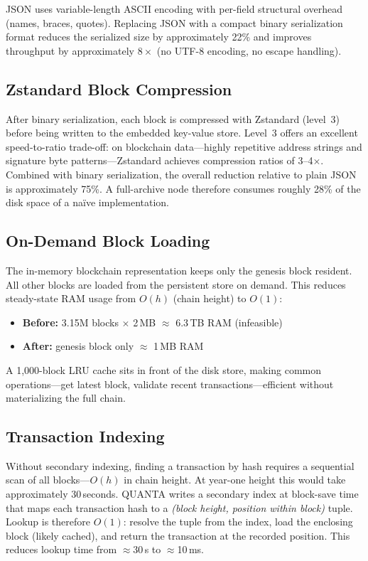 \documentclass[11pt,a4paper]{article}
\begin{document}
JSON uses variable-length ASCII encoding with per-field structural overhead
(names, braces, quotes). Replacing JSON with a compact binary serialization
format reduces the serialized size by approximately 22\% and improves
throughput by approximately $8\times$ (no UTF-8 encoding, no escape handling).

\subsection{Zstandard Block Compression}

After binary serialization, each block is compressed with Zstandard
(level~3) before being written to the embedded key-value store.
Level~3 offers an excellent speed-to-ratio trade-off: on blockchain
data---highly repetitive address strings and signature byte patterns---Zstandard
achieves compression ratios of 3--4$\times$. Combined with binary
serialization, the overall reduction relative to plain JSON is approximately
75\%. A full-archive node therefore consumes roughly 28\% of the disk space of
a na\"{i}ve implementation.

\subsection{On-Demand Block Loading}

The in-memory blockchain representation keeps only the genesis block resident.
All other blocks are loaded from the persistent store on demand. This reduces
steady-state RAM usage from $O(h)$ (chain height) to $O(1)$:

\begin{itemize}
  \item \textbf{Before:} 3.15M blocks $\times$ 2\,MB $\approx$ 6.3\,TB RAM (infeasible)
  \item \textbf{After:} genesis block only $\approx$ 1\,MB RAM
\end{itemize}

A 1,000-block LRU cache sits in front of the disk store, making common
operations---get latest block, validate recent transactions---efficient without
materializing the full chain.

\subsection{Transaction Indexing}

Without secondary indexing, finding a transaction by hash requires a sequential
scan of all blocks---$O(h)$ in chain height. At year-one height this would take
approximately 30\,seconds. QUANTA writes a secondary index at block-save time
that maps each transaction hash to a \emph{(block height, position within block)}
tuple. Lookup is therefore $O(1)$: resolve the tuple from the index, load the
enclosing block (likely cached), and return the transaction at the recorded
position. This reduces lookup time from $\approx$30\,s to $\approx$10\,ms.
\end{document}
